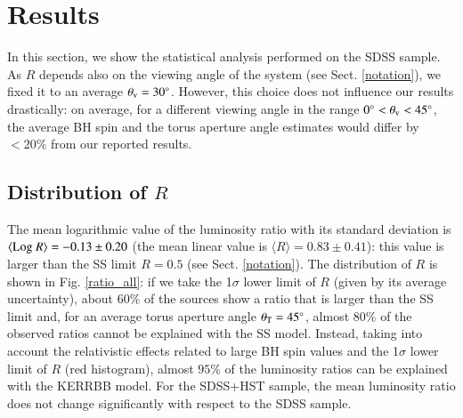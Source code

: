 \documentclass[]{aa}
\begin{document}

\section{Results}\label{results}

In this section, we show the statistical analysis performed on the SDSS sample. As $R$ depends also on the viewing angle of the system (see Sect. \ref{notation}), we fixed it to an average $\theta_{\rm v} = 30^{\circ}$. However, this choice does not influence our results drastically: on average, for a different viewing angle in the range $0^{\circ} < \theta_{\rm v} < 45^{\circ}$, the average BH spin and the torus aperture angle estimates would differ by $< 20 \%$ from our reported results.





\subsection{Distribution of $R$}

The mean logarithmic value of the luminosity ratio with its standard deviation is $\langle {\rm Log}\ R \rangle = -0.13 \pm 0.20$ (the mean linear value is $\langle R \rangle = 0.83 \pm 0.41$): this value is larger than the SS limit $R = 0.5$ (see Sect. \ref{notation}). The distribution of $R$ is shown in Fig. \ref{ratio_all}: if we take the 1$\sigma$ lower limit of $R$ (given by its average uncertainty), about $60 \%$ of the sources show a ratio that is larger than the SS limit and, for an average torus aperture angle $\theta_{\rm T} = 45^{\circ}$, almost $80 \%$ of the observed ratios cannot be explained with the SS model. Instead, taking into account the relativistic effects related to large BH spin values and the 1$\sigma$ lower limit of $R$ (red histogram), almost $95 \%$ of the luminosity ratios can be explained with the KERRBB model. For the SDSS+HST sample, the mean luminosity ratio does not change significantly with respect to the SDSS sample.
\end{document}
